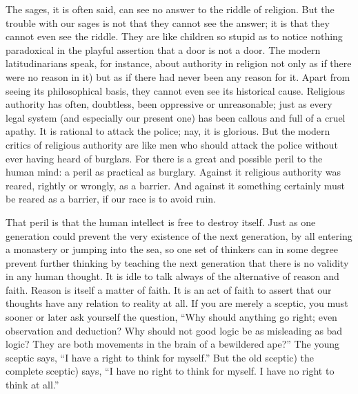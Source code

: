 \documentclass{book}
\begin{document}
The sages, it is often said, can see no answer to the riddle of religion. But the trouble with our sages is not that they cannot see the answer; it is that they cannot even see the riddle. They are like children so stupid as to notice nothing paradoxical in the playful assertion that a door is not a door. The modern latitudinarians speak, for instance, about authority in religion not only as if there were no reason in it) but as if there had never been any reason for it. Apart from seeing its philosophical basis, they cannot even see its historical cause. Religious authority has often, doubtless, been oppressive or unreasonable; just as every legal system (and especially our present one) has been callous and full of a cruel apathy. It is rational to attack the police; nay, it is glorious. But the modern critics of religious authority are like men who should attack the police without ever having heard of burglars. For there is a great and possible peril to the human mind: a peril as practical as burglary. Against it religious authority was reared, rightly or wrongly, as a barrier. And against it something certainly must be reared as a barrier, if our race is to avoid ruin.

That peril is that the human intellect is free to destroy itself. Just as one generation could prevent the very existence of the next generation, by all entering a monastery or jumping into the sea, so one set of thinkers can in some degree prevent further thinking by teaching the next generation that there is no validity in any human thought. It is idle to talk always of the alternative of reason and faith. Reason is itself a matter of faith. It is an act of faith to assert that our thoughts have any relation to reality at all. If you are merely a sceptic, you must sooner or later ask yourself the question, “Why should anything go right; even observation and deduction? Why should not good logic be as misleading as bad logic? They are both movements in the brain of a bewildered ape?” The young sceptic says, “I have a right to think for myself.” But the old sceptic) the complete sceptic) says, “I have no right to think for myself. I have no right to think at all.”
\end{document}
